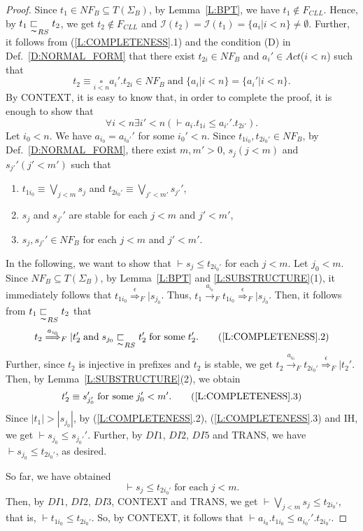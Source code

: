 \documentclass{elsarticle}
\theoremstyle{plain}
\theoremstyle{definition}
\begin{document}
\begin{proof}
        Since $t_1 \in NF_B\subseteq T(\Sigma_B)$, by Lemma~\ref{L:BPT}, we have $t_1 \notin F_{{CLL}}$.
        Hence, by $t_1 \underset{\thicksim}{\sqsubset}_{RS} t_2$,  we get $t_2 \notin F_{{CLL}}$ and ${\mathcal I}(t_2)={\mathcal I}(t_1)=\{a_i|i < n\} \not= \emptyset$.
        Further, it follows from (\ref{L:COMPLETENESS}.1) and the condition (D) in Def.~\ref{D:NORMAL_FORM} that
        there exist $t_{2i}\in NF_B$ and $a_i'\in Act$($i<n$) such that
         \[t_2 \equiv \underset{i < n}{\square}a_i'.t_{2i}\in NF_B\;\text{and}\; \{a_i|i<n\}=\{a_i'|i<n\}.\]
       By CONTEXT, it is easy to know that, in order to complete the proof, it is enough to show that
       \[\forall i<n \exists i'<n(\vdash a_i.t_{1i}\leqslant a_{i'}'.t_{2i'}).\]
    Let $i_0< n$. We have $a_{i_0}=a_{i_0'}'$ for some $i_0'<n$.
    Since $t_{1i_0},t_{2i_0'}\in NF_B$, by Def.~\ref{D:NORMAL_FORM}, there exist $m,m'>0$, $s_j(j<m)$ and $s_{j'}'(j'<m')$ such that
    \begin{enumerate}
      \item $t_{1i_0} \equiv  \underset{j< m}{\bigvee}s_{j}$ and $t_{2i_0'}\equiv  \underset{j'< m'}{\bigvee} s_{j'}'$,
      \item $s_j$ and $s_{j'}'$ are stable for each $j<m$ and $j'<m'$,
      \item $s_j,s_{j'}' \in NF_B$ for each $j<m$ and $j'<m'$.
    \end{enumerate}
    In the following, we want to show that $\vdash  s_{j}\leqslant t_{2i_0'}$ for each $j< m$.
     Let $j_0< m$.
     Since $NF_B \subseteq T(\Sigma_B)$, by Lemma~\ref{L:BPT} and \ref{L:SUBSTRUCTURE}(1), it immediately follows that $t_{1i_0}\stackrel{\epsilon}{\Longrightarrow}_F|s_{j_0}$.
    Thus, $t_1 \stackrel{a_{i_0}}{\longrightarrow}_F t_{1i_0} \stackrel{\epsilon}{\Longrightarrow}_F| s_{j_0}$.
    Then, it follows from  $t_1 \underset{\thicksim}{\sqsubset}_{RS} t_2$ that
    \[t_2 \stackrel{a_{i_0}}{\Longrightarrow}_F|t_2' \;\text{and}\; s_{j_0}\underset{\thicksim}{\sqsubset}_{RS} t_2'\;\text{for some}\; t_2'.\tag{\ref{L:COMPLETENESS}.2}\]
    Further, since $t_2$ is injective in prefixes and $t_2$ is stable, we get $t_2 \stackrel{a_{i_0}}{\longrightarrow}_F t_{2i_0'}\stackrel{\epsilon}{\Longrightarrow}_F|t_2'$.
    Then, by Lemma~\ref{L:SUBSTRUCTURE}(2), we obtain
    \[t_2'\equiv s_{j_0'}' \;\text{for some}\; j_0'< m'.\tag{\ref{L:COMPLETENESS}.3}\]
    Since $|t_1|>|s_{j_0}|$, by (\ref{L:COMPLETENESS}.2), (\ref{L:COMPLETENESS}.3) and IH, we get $\vdash  s_{j_0}\leqslant s_{j_0'}'$.
    Further, by $DI1$, $DI2$, $DI5$ and TRANS, we have $\vdash  s_{j_0}\leqslant t_{2i_0'}$, as desired.

    So far, we have obtained
    \[\vdash s_{j} \leqslant t_{2i_0'}\;\text{for each}\;j<m.\]
    Then, by $DI1$, $DI2$, $DI3$, CONTEXT and TRANS, we get $\vdash \underset{j<m}{\bigvee}s_{j} \leqslant t_{2i_0'}$, that is, $\vdash t_{1i_0}\leqslant t_{2i_0'}$.
    So, by CONTEXT, it follows that $\vdash  a_{i_0}.t_{1i_0} \leqslant a_{i_0'}'.t_{2i_0'}$.
\end{proof}
\end{document}
